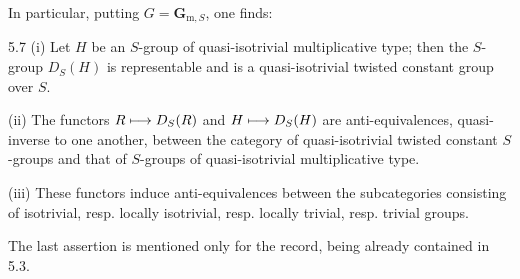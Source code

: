 In particular, putting $G=\mathbf{G}_{\mathrm{m},S}$, one finds:
\begin{corollary}{5.7}\label{X.5.7}
(i) Let $H$ be an $S$-group of quasi-isotrivial multiplicative type; then the $S$-group $D_S(H)$ is representable and is a quasi-isotrivial twisted constant group over $S$.

(ii) The functors $R\longmapsto D_S(R)$ and $H\longmapsto D_S(H)$ are anti-equivalences, quasi-inverse to one another, between the category of quasi-isotrivial twisted constant $S$-groups and that of $S$-groups of quasi-isotrivial multiplicative type.

(iii) These functors induce anti-equivalences between the subcategories consisting of isotrivial, resp. locally isotrivial, resp. locally trivial, resp. trivial groups.
\end{corollary}
The last assertion is mentioned only for the record, being already contained in 5.3.

